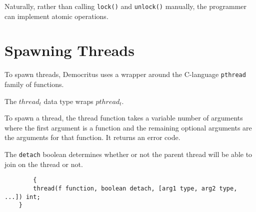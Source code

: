 		Naturally, rather than calling \texttt{lock()} and \texttt{unlock()} manually, the programmer can implement atomic operations.

	\section{Spawning Threads}
		To spawn threads, Democritus uses a wrapper around the C-language \texttt{pthread} family of functions.

		The \texttt{$thread_t$} data type wraps \texttt{$pthread_t$}.

		To spawn a thread, the thread function takes a variable number of arguments where the first argument is a function and the remaining optional arguments are the arguments for that function. It returns an error code.

		The \texttt{detach} boolean determines whether or not the parent thread will be able to join on the thread or not.
		\begin{lstlisting}
        {	
		thread(f function, boolean detach, [arg1 type, arg2 type, ...]) int;
	}
		\end{lstlisting}
